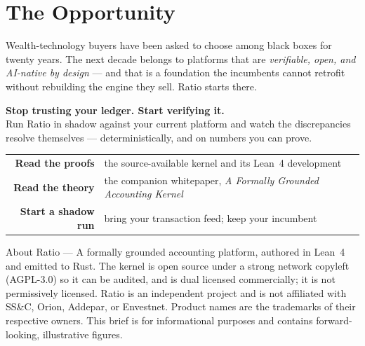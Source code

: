 \section{The Opportunity}

Wealth-technology buyers have been asked to choose among black boxes for twenty
years. The next decade belongs to platforms that are \emph{verifiable, open, and
AI-native by design} --- and that is a foundation the incumbents cannot retrofit
without rebuilding the engine they sell. Ratio starts there.

\begin{center}
\begin{minipage}{0.95\textwidth}
\begin{keybox}
\centering\sffamily\large
\textbf{Stop trusting your ledger. Start verifying it.}\\[4pt]
\normalsize Run Ratio in shadow against your current platform and watch the
discrepancies resolve themselves --- deterministically, and on numbers you can prove.
\end{keybox}
\end{minipage}
\end{center}

\vspace{8pt}

\begin{center}
\renewcommand{\arraystretch}{1.3}
\sffamily
\begin{tabular}{@{}r l@{}}
\textbf{\color{ratioInk}Read the proofs} & the source-available kernel and its Lean~4 development \\
\textbf{\color{ratioInk}Read the theory} & the companion whitepaper, \emph{A Formally Grounded Accounting Kernel} \\
\textbf{\color{ratioInk}Start a shadow run} & bring your transaction feed; keep your incumbent \\
\end{tabular}
\end{center}

\vspace{10pt}
\begin{center}
{\sffamily\footnotesize\color{negGray}
About Ratio --- A formally grounded accounting platform, authored in Lean~4 and
emitted to Rust. The kernel is open source under a strong network copyleft
(AGPL-3.0) so it can be audited, and is dual licensed commercially; it is not
permissively licensed. Ratio is an independent project and
is not affiliated with SS\&C, Orion, Addepar, or Envestnet. Product names are the
trademarks of their respective owners. This brief is for informational purposes and
contains forward-looking, illustrative figures.}
\end{center}
